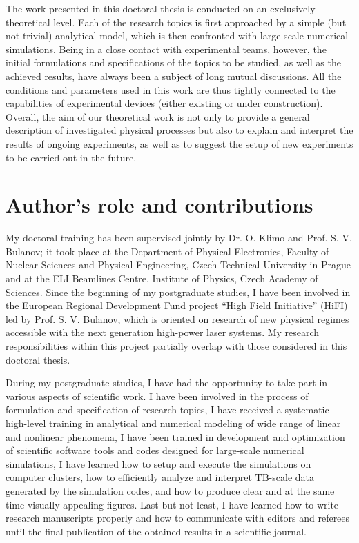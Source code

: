 \documentclass[10pt, a4paper, twoside, openright]{report}
\newcommand{\q}[1]{``#1''} %
\begin{document}
The work presented in this doctoral thesis is conducted on an exclusively theoretical level. Each of the research topics is first approached by a simple (but not trivial) analytical model, which is then confronted with large-scale numerical simulations. Being in a close contact with experimental teams, however, the initial formulations and specifications of the topics to be studied, as well as the achieved results, have always been a subject of long mutual discussions. All the conditions and parameters used in this work are thus tightly connected to the capabilities of experimental devices (either existing or under construction). Overall, the aim of our theoretical work is not only to provide a general description of investigated physical processes but also to explain and interpret the results of ongoing experiments, as well as to suggest the setup of new experiments to be carried out in the future.


\section{Author's role and contributions}
%

My doctoral training has been supervised jointly by Dr. O. Klimo and Prof. S. V. Bulanov; it took place at the Department of Physical Electronics, Faculty of Nuclear Sciences and Physical Engineering, Czech Technical University in Prague and at the ELI Beamlines Centre, Institute of Physics, Czech Academy of Sciences. Since the beginning of my postgraduate studies, I have been involved in the European Regional Development Fund project \q{High Field Initiative} (HiFI) led by Prof. S. V. Bulanov, which is oriented on research of new physical regimes accessible with the next generation high-power laser systems. My research responsibilities within this project partially overlap with those considered in this doctoral thesis.

During my postgraduate studies, I have had the opportunity to take part in various aspects of scientific work. I have been involved in the process of formulation and specification of research topics, I have received a systematic high-level training in analytical and numerical modeling of wide range of linear and nonlinear phenomena, I have been trained in development and optimization of scientific software tools and codes designed for large-scale numerical simulations, I have learned how to setup and execute the simulations on computer clusters, how to efficiently analyze and interpret $ \mathrm{TB} $-scale data generated by the simulation codes, and how to produce clear and at the same time visually appealing figures. Last but not least, I have learned how to write research manuscripts properly and how to communicate with editors and referees until the final publication of the obtained results in a scientific journal.
\end{document}
